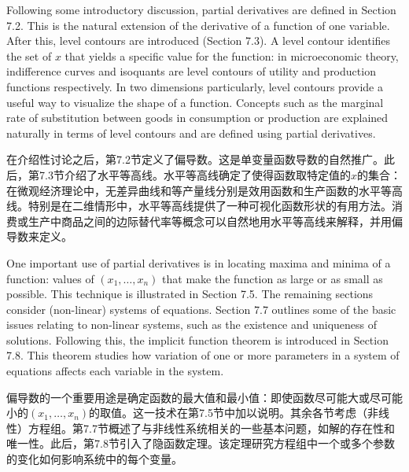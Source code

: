 \begin{original}
Following some introductory discussion, partial derivatives are defined in Section 7.2. This is the natural extension of the derivative of a function of one variable. After this, level contours are introduced (Section 7.3). A level contour identifies the set of $x$ that yields a specific value for the function: in microeconomic theory, indifference curves and isoquants are level contours of utility and production functions respectively. In two dimensions particularly, level contours provide a useful way to visualize the shape of a function. Concepts such as the marginal rate of substitution between goods in consumption or production are explained naturally in terms of level contours and are defined using partial derivatives.
\end{original}
\begin{translation}
在介绍性讨论之后，第7.2节定义了偏导数。这是单变量函数导数的自然推广。此后，第7.3节介绍了水平等高线。水平等高线确定了使得函数取特定值的$x$的集合：在微观经济理论中，无差异曲线和等产量线分别是效用函数和生产函数的水平等高线。特别是在二维情形中，水平等高线提供了一种可视化函数形状的有用方法。消费或生产中商品之间的边际替代率等概念可以自然地用水平等高线来解释，并用偏导数来定义。
\end{translation}

\begin{original}
One important use of partial derivatives is in locating maxima and minima of a function: values of $(x_1, \dots, x_n)$ that make the function as large or as small as possible. This technique is illustrated in Section 7.5. The remaining sections consider (non-linear) systems of equations. Section 7.7 outlines some of the basic issues relating to non-linear systems, such as the existence and uniqueness of solutions. Following this, the implicit function theorem is introduced in Section 7.8. This theorem studies how variation of one or more parameters in a system of equations affects each variable in the system.
\end{original}
\begin{translation}
偏导数的一个重要用途是确定函数的最大值和最小值：即使函数尽可能大或尽可能小的$(x_1, \dots, x_n)$的取值。这一技术在第7.5节中加以说明。其余各节考虑（非线性）方程组。第7.7节概述了与非线性系统相关的一些基本问题，如解的存在性和唯一性。此后，第7.8节引入了隐函数定理。该定理研究方程组中一个或多个参数的变化如何影响系统中的每个变量。
\end{translation}

